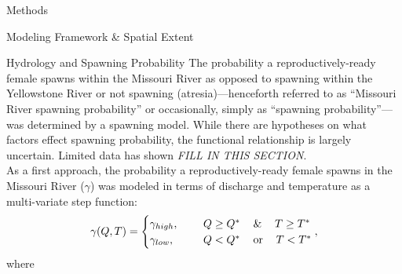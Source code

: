 \documentclass[12pt]{article}
\begin{document}
\begin{section}{Methods}
\begin{subsection}{Modeling Framework \& Spatial Extent}
\begin{subsubsection}{Hydrology and Spawning Probability}
The probability a reproductively-ready female spawns within the Missouri River as opposed to spawning within the Yellowstone River or not spawning (atresia)---henceforth referred to as ``Missouri River spawning probability'' or occasionally, simply as ``spawning probability''---was determined by a spawning model.  While there are hypotheses on what factors effect spawning probability, the functional relationship is largely uncertain.  Limited data has shown \textit{FILL IN THIS SECTION}.\\
 
As a first approach, the probability a reproductively-ready female spawns in the Missouri River ($\gamma$) was modeled in terms of discharge and temperature as a multi-variate step function:
\begin{equation}
\gamma(Q, T) = \begin{cases}
\gamma_{high}, & \hspace{0.5cm}  Q\geq Q^{*} \hspace{12pt} \& \hspace{12pt} T\geq T^{*}\\
\gamma_{low}, & \hspace{0.5cm}  Q< Q^{*} \hspace{12pt} \mbox{or} \hspace{12pt} T< T^{*}
\end{cases},
\end{equation}
where\\


\end{subsubsection}
\end{subsection}
\end{section}
\end{document}
